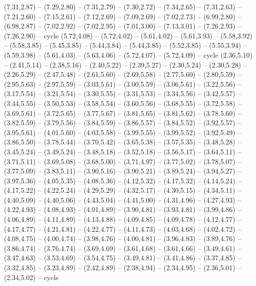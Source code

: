 \expandafter\def\csname geo:gebiet:FJI\endcsname{
  }
\expandafter\def\csname geo:gebiet:TZA\endcsname{
  (7.31,2.87) -- (7.29,2.80) -- (7.31,2.79) -- (7.30,2.72) -- (7.34,2.65) -- (7.31,2.63) -- (7.21,2.60) -- (7.15,2.61) -- (7.12,2.69) -- (7.09,2.69) -- (7.02,2.73) -- (6.99,2.80) -- (6.98,2.87) -- (7.02,2.92) -- (7.02,2.95) -- (7.01,3.00) -- (7.13,3.01) -- (7.26,2.93) -- (7.26,2.90) -- cycle}
\expandafter\def\csname geo:gebiet:SAH\endcsname{
  (5.72,4.08) -- (5.72,4.02) -- (5.61,4.02) -- (5.61,3.93) -- (5.58,3.92) -- (5.58,3.85) -- (5.45,3.85) -- (5.44,3.84) -- (5.44,3.85) -- (5.52,3.85) -- (5.55,3.94) -- (5.59,3.98) -- (5.61,4.03) -- (5.63,4.06) -- (5.72,4.07) -- (5.72,4.09) -- cycle}
\expandafter\def\csname geo:gebiet:CAN\endcsname{
  (2.36,5.10) -- (2.41,5.14) -- (2.38,5.16) -- (2.40,5.22) -- (2.39,5.27) -- (2.30,5.24) -- (2.30,5.28) -- (2.26,5.29) -- (2.47,5.48) -- (2.61,5.60) -- (2.69,5.58) -- (2.77,5.60) -- (2.80,5.59) -- (2.95,5.63) -- (2.97,5.59) -- (3.03,5.61) -- (3.00,5.59) -- (3.06,5.61) -- (3.22,5.56) -- (3.17,5.54) -- (3.21,5.54) -- (3.30,5.55) -- (3.31,5.53) -- (3.34,5.56) -- (3.42,5.57) -- (3.44,5.55) -- (3.50,5.53) -- (3.58,5.54) -- (3.60,5.56) -- (3.68,5.55) -- (3.72,5.58) -- (3.69,5.61) -- (3.72,5.65) -- (3.77,5.67) -- (3.81,5.65) -- (3.81,5.62) -- (3.78,5.60) -- (3.82,5.59) -- (3.79,5.56) -- (3.84,5.59) -- (3.86,5.57) -- (3.84,5.52) -- (3.92,5.57) -- (3.95,5.61) -- (4.01,5.60) -- (4.03,5.58) -- (3.99,5.55) -- (3.99,5.52) -- (3.92,5.49) -- (3.86,5.50) -- (3.78,5.44) -- (3.70,5.42) -- (3.65,5.38) -- (3.57,5.35) -- (3.48,5.28) -- (3.45,5.24) -- (3.49,5.24) -- (3.48,5.18) -- (3.52,5.18) -- (3.56,5.17) -- (3.64,5.11) -- (3.71,5.11) -- (3.69,5.08) -- (3.68,5.00) -- (3.71,4.97) -- (3.77,5.02) -- (3.78,5.07) -- (3.77,5.09) -- (3.83,5.11) -- (3.90,5.16) -- (3.90,5.21) -- (3.89,5.24) -- (3.94,5.27) -- (3.97,5.36) -- (4.05,5.35) -- (4.08,5.36) -- (4.12,5.32) -- (4.17,5.32) -- (4.14,5.24) -- (4.17,5.22) -- (4.22,5.24) -- (4.29,5.29) -- (4.32,5.17) -- (4.30,5.15) -- (4.34,5.11) -- (4.40,5.09) -- (4.40,5.06) -- (4.43,5.04) -- (4.41,5.00) -- (4.31,4.96) -- (4.27,4.93) -- (4.22,4.93) -- (4.08,4.93) -- (4.01,4.89) -- (3.90,4.81) -- (3.93,4.81) -- (3.99,4.86) -- (4.06,4.89) -- (4.11,4.89) -- (4.13,4.88) -- (4.09,4.85) -- (4.09,4.78) -- (4.12,4.77) -- (4.17,4.77) -- (4.21,4.81) -- (4.22,4.77) -- (4.11,4.73) -- (4.03,4.68) -- (4.02,4.72) -- (4.08,4.75) -- (4.00,4.74) -- (3.98,4.76) -- (4.00,4.81) -- (3.96,4.83) -- (3.89,4.76) -- (3.86,4.74) -- (3.76,4.74) -- (3.69,4.69) -- (3.61,4.68) -- (3.61,4.66) -- (3.49,4.61) -- (3.47,4.63) -- (3.53,4.69) -- (3.54,4.75) -- (3.49,4.81) -- (3.41,4.86) -- (3.37,4.85) -- (3.32,4.85) -- (3.23,4.89) -- (2.42,4.89) -- (2.38,4.94) -- (2.34,4.95) -- (2.36,5.01) -- (2.34,5.02) -- cycle
}
